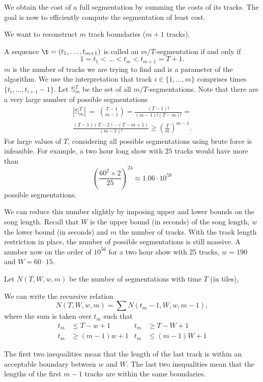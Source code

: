\documentclass[twocolumn]{article}
\newcommand{\segs}{\mathbb S}
\begin{document}
	We obtain the cost of a full segmentation by summing the costs of its tracks. The goal is now to efficiently compute the segmentation of least cost.
	
	We want to reconstruct $m$ track boundaries ($m+1$ tracks).
	
	A sequence $\t = (t_1, \ldots, t_{m+1})$ is called an $m/T$-segmentation if and only if
	\[
	1 = t_1 < \ldots < t_m < t_{m+1} = T+1.
	\]
	$m$ is the number of tracks we are trying to find and is a parameter of the algorithm. We use the interpretation that track $i \in \{1, \ldots, m\}$ comprises times $\{t_i, \ldots, t_{i+1}-1\}$. Let $\segs^T_m$ be the set of all $m/T$-segmentations. Note that there are a very large number of possible segmentations 
	\begin{multline*}
		|\segs^T_m| ~=~ \binom{T-1}{m-1}
		= \frac{(T-1)!}{(m-1)!(T-m)!} =\\
		\frac{(T-1)(T-2)\cdots(T-m+1)}{(m-1)!} \ge \left( \frac{T}{m}\right)^{m-1}.
	\end{multline*} 
	For large values of $T$, considering all possible segmentations using brute force is infeasible. For example, a two hour long show with $25$ tracks would have more than 
	\[
	\left( \frac{60^2 \times 2}{25}\right)^{24}  \approx 1.06 \cdot 10^{59}
	\] possible segmentations. 
	
	We can reduce this number slightly by imposing upper and lower bounds on the song length.  Recall that $W$ is the upper bound (in seconds) of the song length, $w$ the lower bound (in seconds) and $m$ the number of tracks. With the track length restriction in place, the number of possible segmentations is still massive. A number now on the order of $10^{56}$ for a two hour show with $25$ tracks, $w=190$ and $W=60\cdot15$.
	
	Let $N(T,W,w,m)$ be the number of segmentations with time $T$ (in tiles),
	
	We can write the recursive relation $$N(T,W,w,m) = \sum N(t_m-1,W,w,m-1),$$ where the sum is taken over $t_m$ such that 
	\begin{align*}
		t_m &\le T-w+1 & t_m &\ge T-W+1\\
		t_m &\ge (m-1)w+1 & t_m &\le (m-1)W+1
	\end{align*}
	
	The first two inequalities mean that the length of the last track is within an acceptable boundary between $w$ and $W$. The last two inequalities mean that the lengths of the first $m-1$ tracks are within the same boundaries. 
	
\end{document}
